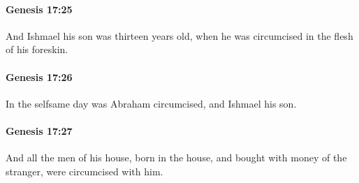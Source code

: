 		\paragraph{Genesis 17:25} %
			\label{GENESIS-17-25}

			And Ishmael his son was thirteen years old, when he was circumcised in the flesh of his foreskin.


		\paragraph{Genesis 17:26} %
			\label{GENESIS-17-26}

			In the selfsame day was Abraham circumcised, and Ishmael his son.


		\paragraph{Genesis 17:27} %
			\label{GENESIS-17-27}

			And all the men of his house, born in the house, and bought with money of the stranger, were circumcised with him.


